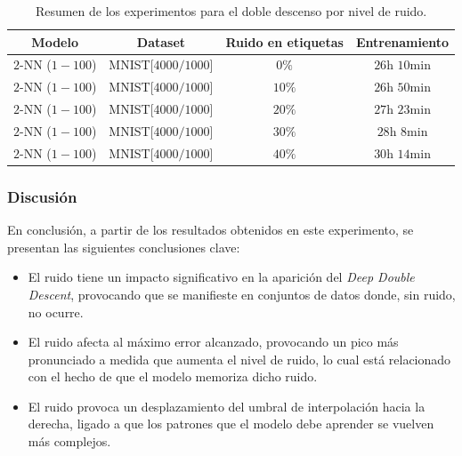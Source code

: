 \begin{table}[h!]
    \centering
    \begin{tabular}{|c|c|c|c|}
    \hline
    \textbf{Modelo}       & \textbf{Dataset} & \textbf{Ruido en etiquetas} & \textbf{Entrenamiento} \\ 
    \hline
    $2$-NN ($1-100$)          & MNIST[$4000/1000$]        & $0\%$       & $26$h $10$min       \\ 
    $2$-NN ($1-100$)          & MNIST[$4000/1000$]        & $10\%$         & $26$h $50$min       \\ 
    $2$-NN ($1-100$)          & MNIST[$4000/1000$]        & $20\%$         & $27$h $23$min       \\ 
    $2$-NN ($1-100$)          & MNIST[$4000/1000$]        & $30\%$          & $28$h $8$min       \\ 
    $2$-NN ($1-100$)          & MNIST[$4000/1000$]       & $40\%$          & $30$h $14$min       \\  
    \hline
    \end{tabular}
    \caption[Resumen de los experimentos para el doble descenso por nivel de ruido.]{Resumen de los experimentos para el doble descenso por nivel de ruido.}
    \label{tab:noisewisedd}
\end{table}

\subsubsection{Discusión}\label{subsubsec:discusion-ruido}

En conclusión, a partir de los resultados obtenidos en este experimento, se presentan las siguientes conclusiones clave:

\begin{itemize}
    \item El ruido tiene un impacto significativo en la aparición del \textit{Deep Double Descent}, provocando que se manifieste en conjuntos de datos donde, sin ruido, no ocurre.
    \item El ruido afecta al máximo error alcanzado, provocando un pico más pronunciado a medida que aumenta el nivel de ruido, lo cual está relacionado con el hecho de que el modelo memoriza dicho ruido.
    \item El ruido provoca un desplazamiento del umbral de interpolación hacia la derecha, ligado a que los patrones que el modelo debe aprender se vuelven más complejos.
\end{itemize}

